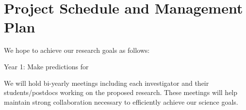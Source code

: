 \section{Project Schedule and Management Plan}

We hope to achieve our research goals as follows:

Year 1: Make predictions for  

We will  hold bi-yearly meetings including each investigator and their students/postdocs working on the proposed research. These meetings will help maintain strong collaboration necessary to efficiently achieve our science goals.
